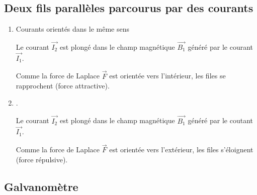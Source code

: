 \documentclass[
    11pt,
    a4paper,
    oneside,
    headinlcude, footinclude,
    twoside,
]{report}
\renewcommand{\vec}[1]{\overrightarrow{#1}}
\begin{document}
\subsection{Deux fils parallèles parcourus par des courants}
\label{sub:deux_fils_paralleles_parcourus_par_des_courants}
\begin{enumerate}
    \item Courants orientés dans le même sens
        \begin{center}
            \begin{minipage}{.5\linewidth}
            \end{minipage}
            \begin{minipage}{.49\linewidth}
                \setlength{\parskip}{.3em}
                Le courant $\vec{I_{2}}$ est plongé dans le champ magnétique $\vec{B_{1}}$
                généré par le courant $\vec{I_{1}}$.

                Comme la force de Laplace $\vec F$ est orientée vers
                l'intérieur, les files se rapprochent (force attractive).
            \end{minipage}
        \end{center}

    \item {\color{white}.}
        \begin{center}
            \begin{minipage}{.5\linewidth}
            \end{minipage}
            \begin{minipage}{.49\linewidth}
                \setlength{\parskip}{.3em}
                Le courant $\vec{I_{2}}$ est plongé dans le champ magnétique
                $\vec{B_{1}}$ généré par le coutant $\vec{I_{1}}$.

                Comme la force de Laplace $\vec F$ est orientée vers
                l'extérieur, les files s'éloignent (force répulsive).
            \end{minipage}
        \end{center}

\end{enumerate}

\subsection{Galvanomètre}
\label{sub:galvanometre}
\end{document}
